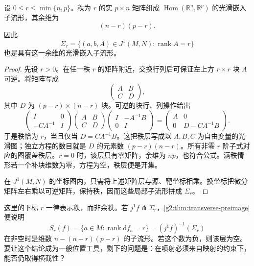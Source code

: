 \begin{proposition}\label{g2:prop:matrix-rank-strata}
	设 \(0\leq r\leq\min\{n,p\}\)。秩为 \(r\) 的实 \(p\times n\) 矩阵组成 \(\operatorname{Hom}(\mathbb R^n,\mathbb R^p)\) 的光滑嵌入子流形，其余维为
	\[
		(n-r)(p-r).
	\]
	因此
	\[
		\Sigma_r=\{(a,b,A)\in J^1(M,N):\operatorname{rank}A=r\}
	\]
	也是具有这一余维的光滑嵌入子流形。
\end{proposition}
\begin{proof}
	先设 \(r>0\)。在任一秩 \(r\) 的矩阵附近，交换行列后可保证左上方 \(r\times r\) 块 \(A\) 可逆。将矩阵写成
	\[
		\begin{pmatrix}A&B\\ C&D\end{pmatrix},
	\]
	其中 \(D\) 为 \((p-r)\times(n-r)\) 块。可逆的块行、列操作给出
	\[
		\begin{pmatrix}I&0\\-CA^{-1}&I\end{pmatrix}
		\begin{pmatrix}A&B\\ C&D\end{pmatrix}
		\begin{pmatrix}I&-A^{-1}B\\0&I\end{pmatrix}
		=\begin{pmatrix}A&0\\0&D-CA^{-1}B\end{pmatrix}.
	\]
	于是秩恰为 \(r\)，当且仅当 \(D=CA^{-1}B\)。这把秩层写成以 \(A,B,C\) 为自由变量的光滑图；独立方程的数目就是 \(D\) 的元素数 \((p-r)(n-r)\)。所有非零 \(r\) 阶子式对应的图覆盖秩层。\(r=0\) 时，该层只有零矩阵，余维为 \(np\)，也符合公式。满秩情形若一个补块维数为零，方程为空，秩层便是开集。

	在 \(J^1(M,N)\) 的坐标图内，只需将上述矩阵层与源、靶坐标相乘。换坐标把微分矩阵左右乘以可逆矩阵，保持秩，因而这些局部子流形拼成 \(\Sigma_r\)。
\end{proof}

这里的下标 \(r\) 一律表示秩，而非余秩。若 \(j^1f\pitchfork\Sigma_r\)，\cref{g2:thm:transverse-preimage}便说明
\[
	S_r(f)=\{a\in M:\operatorname{rank}\mathrm d f_a=r\}
	=(j^1f)^{-1}(\Sigma_r)
\]
在非空时是维数 \(n-(n-r)(p-r)\) 的子流形。若这个数为负，则该层为空。要让这个结论成为一般位置工具，剩下的问题是：在喷射必须来自映射的约束下，能否仍取得横截性？

